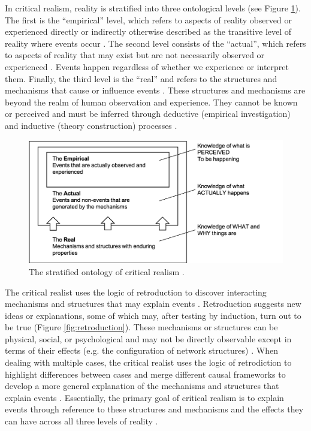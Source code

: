 In critical realism, reality is stratified into three ontological levels (see Figure \ref{fig:stratified_reality}). The first is the \enquote{empirical} level, which refers to aspects of reality observed or experienced directly or indirectly otherwise described as the transitive level of reality where events occur \citep{fletcher2017applying}. The second level consists of the \enquote{actual}, which refers to aspects of reality that may exist but are not necessarily observed or experienced \citep{mcevoy2006critical}. Events happen regardless of whether we experience or interpret them. Finally, the third level is the \enquote{real} and refers to the structures and mechanisms that cause or influence events \citep{zachariadis2013methodological}. These structures and mechanisms are beyond the realm of human observation and experience. They cannot be known or perceived and must be inferred through deductive (empirical investigation) and inductive (theory construction) processes \citep{mcevoy2006critical,wynn2012principles}. \medskip

\begin{figure}
\centering
\includegraphics[width=0.9\linewidth]{Images/stratified_reality.png}
\caption[The stratified ontology of critical realism]{The stratified ontology of critical realism \citep{bhaskar2013realist,mingers2006realising}.}
\label{fig:stratified_reality}
\end{figure}

The critical realist uses the logic of retroduction to discover interacting mechanisms and structures that may explain events \citep{sayer1999realism,wynn2012principles}. Retroduction suggests new ideas or explanations, some of which may, after testing by induction, turn out to be true (Figure \ref{fig:retroduction}). These mechanisms or structures can be physical, social, or psychological and may not be directly observable except in terms of their effects (e.g. the configuration of network structures) \citep{mcavoy2018critical}. When dealing with multiple cases, the critical realist uses the logic of retrodiction to highlight differences between cases and merge different causal frameworks to develop a more general explanation of the mechanisms and structures that explain events \citep{welch2011theorising,mcavoy2018critical}. Essentially, the primary goal of critical realism is to explain events through reference to these structures and mechanisms and the effects they can have across all three levels of reality \citep{wynn2012principles,fletcher2017applying}.

